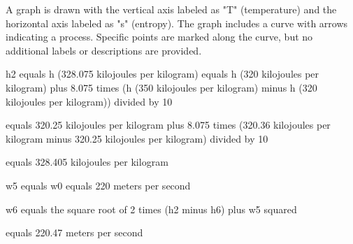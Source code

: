 A graph is drawn with the vertical axis labeled as "T" (temperature) and the horizontal axis labeled as "s" (entropy). The graph includes a curve with arrows indicating a process. Specific points are marked along the curve, but no additional labels or descriptions are provided.

h2 equals h (328.075 kilojoules per kilogram)  
equals h (320 kilojoules per kilogram) plus 8.075 times (h (350 kilojoules per kilogram) minus h (320 kilojoules per kilogram)) divided by 10  

equals 320.25 kilojoules per kilogram plus 8.075 times (320.36 kilojoules per kilogram minus 320.25 kilojoules per kilogram) divided by 10  

equals 328.405 kilojoules per kilogram  

w5 equals w0 equals 220 meters per second  

w6 equals the square root of 2 times (h2 minus h6) plus w5 squared  

equals 220.47 meters per second